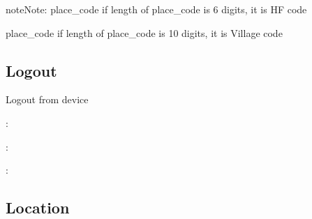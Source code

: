\documentclass[letterpaper,10pt,english,openany,oneside]{sphinxmanual}
\begin{document}
\begin{sphinxadmonition}{note}{Note:}
\sphinxAtStartPar
place\_code if length of place\_code is 6 digits, it is HF code

\sphinxAtStartPar
place\_code if length of place\_code is 10 digits, it is Village code
\end{sphinxadmonition}


\subsection{Logout}
\label{\detokenize{api/v4:logout}}

\begin{fulllineitems}
\label{\detokenize{api/v4:post--api4-Users-logout}}
\sphinxAtStartPar
Logout from device

\sphinxAtStartPar
{}:

\begin{sphinxVerbatim}[commandchars=\\\{\}]
   
\end{sphinxVerbatim}

\sphinxAtStartPar
{}:

\begin{sphinxVerbatim}[commandchars=\\\{\}]
   
\end{sphinxVerbatim}

\sphinxAtStartPar
{}:

\begin{sphinxVerbatim}[commandchars=\\\{\}]
   
\end{sphinxVerbatim}

\end{fulllineitems}



\subsection{Location}
\label{\detokenize{api/v4:location}}
\end{document}
